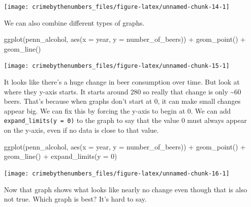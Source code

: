 \documentclass[
]{krantz}
\makeatletter
\newenvironment{Shaded}{\begin{snugshade}}{\end{snugshade}}
\newcommand{\AttributeTok}[1]{\textcolor[rgb]{0.61,0.61,0.61}{#1}}
\newcommand{\DecValTok}[1]{\textcolor[rgb]{0.06,0.06,0.06}{#1}}
\newcommand{\FunctionTok}[1]{\textcolor[rgb]{0,0,0}{#1}}
\newcommand{\NormalTok}[1]{#1}
\newcommand{\SpecialCharTok}[1]{\textcolor[rgb]{0,0,0}{#1}}
\newenvironment{kframe}{%
\medskip{}
\setlength{\fboxsep}{.8em}
 \def\at@end@of@kframe{}%
 \ifinner\ifhmode%
  \def\at@end@of@kframe{\end{minipage}}%
  \begin{minipage}{\columnwidth}%
 \fi\fi%
 \def\FrameCommand##1{\hskip\@totalleftmargin \hskip-\fboxsep
 \colorbox{shadecolor}{##1}\hskip-\fboxsep
     \hskip-\linewidth \hskip-\@totalleftmargin \hskip\columnwidth}%
 \MakeFramed {\advance\hsize-\width
   \@totalleftmargin\z@ \linewidth\hsize
   \@setminipage}}%
 {\par\unskip\endMakeFramed%
 \at@end@of@kframe}
\renewenvironment{Shaded}{\begin{kframe}}{\end{kframe}}
\makeatother
\begin{document}
\begin{center}\texttt{[image: crimebythenumbers\_files/figure-latex/unnamed-chunk-14-1]} \end{center}

We can also combine different types of graphs.

\begin{Shaded}
\begin{Highlighting}[]
\FunctionTok{ggplot}\NormalTok{(penn\_alcohol, }\FunctionTok{aes}\NormalTok{(}\AttributeTok{x =}\NormalTok{ year, }\AttributeTok{y =}\NormalTok{ number\_of\_beers)) }\SpecialCharTok{+}
  \FunctionTok{geom\_point}\NormalTok{() }\SpecialCharTok{+} \FunctionTok{geom\_line}\NormalTok{()}
\end{Highlighting}
\end{Shaded}

\begin{center}\texttt{[image: crimebythenumbers\_files/figure-latex/unnamed-chunk-15-1]} \end{center}

It looks like there's a huge change in beer consumption over time. But look at where they y-axis starts. It starts around 280 so really that change is only \textasciitilde60 beers. That's because when graphs don't start at 0, it can make small changes appear big. We can fix this by forcing the y-axis to begin at 0. We can add \texttt{expand\_limits(y\ =\ 0)} to the graph to say that the value 0 must always appear on the y-axis, even if no data is close to that value.

\begin{Shaded}
\begin{Highlighting}[]
\FunctionTok{ggplot}\NormalTok{(penn\_alcohol, }\FunctionTok{aes}\NormalTok{(}\AttributeTok{x =}\NormalTok{ year, }\AttributeTok{y =}\NormalTok{ number\_of\_beers)) }\SpecialCharTok{+}
  \FunctionTok{geom\_point}\NormalTok{() }\SpecialCharTok{+} \FunctionTok{geom\_line}\NormalTok{() }\SpecialCharTok{+} \FunctionTok{expand\_limits}\NormalTok{(}\AttributeTok{y =} \DecValTok{0}\NormalTok{)}
\end{Highlighting}
\end{Shaded}

\begin{center}\texttt{[image: crimebythenumbers\_files/figure-latex/unnamed-chunk-16-1]} \end{center}

Now that graph shows what looks like nearly no change even though that is also not true. Which graph is best? It's hard to say.
\end{document}
